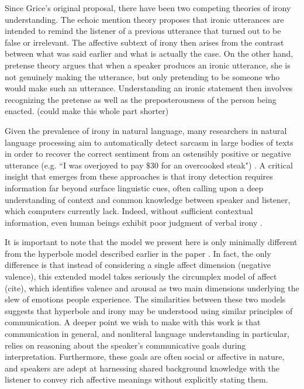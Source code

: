 \documentclass[10pt,letterpaper]{article}
\begin{document}


Since Grice's original proposal, there have been two competing theories of irony understanding. The echoic mention theory \cite{sperber1981irony, jorgensen1984test} proposes that ironic utterances are intended to remind the listener of a previous utterance that turned out to be false or irrelevant. The affective subtext of irony then arises from the contrast between what was said earlier and what is actually the case. On the other hand, pretense theory \cite{clark1984pretense} argues that when a speaker produces an ironic utterance, she is not genuinely making the utterance, but only pretending to be someone who would make such an utterance. Understanding an ironic statement then involves recognizing the pretense as well as the preposterousness of the person being enacted. (could make this whole part shorter) 

Given the prevalence of irony in natural language, many researchers in natural language processing aim to automatically detect sarcasm in large bodies of texts in order to recover the correct sentiment from an ostensibly positive or negative utterance (e.g. ``I was overjoyed to pay $\$30$ for an overcooked steak") \cite{davidov2010semi, filatova2012irony}. A critical insight that emerges from these approaches is that irony detection requires information far beyond surface linguistic cues, often calling upon a deep understanding of context and common knowledge between speaker and listener, which computers currently lack. Indeed, without sufficient contextual information, even human beings exhibit poor judgment of verbal irony \cite{gonzalez2011identifying, wallacehumans}.

It is important to note that the model we present here is only minimally different from the hyperbole model described earlier in the paper \cite{kao2014nonliteral}. In fact, the only difference is that instead of considering a single affect dimension (negative valence), this extended model takes seriously the circumplex model of affect (cite), which identifies valence and arousal as two main dimensions underlying the slew of emotions people experience. The similarities between these two models suggests that hyperbole and irony may be understood using similar principles of communication. A deeper point we wish to make with this work is that communication in general, and nonliteral language understanding in particular, relies on reasoning about the speaker's communicative goals during interpretation. Furthermore, these goals are often social or affective in nature, and speakers are adept at harnessing shared background knowledge with the listener to convey rich affective meanings without explicitly stating them. 
\end{document}
